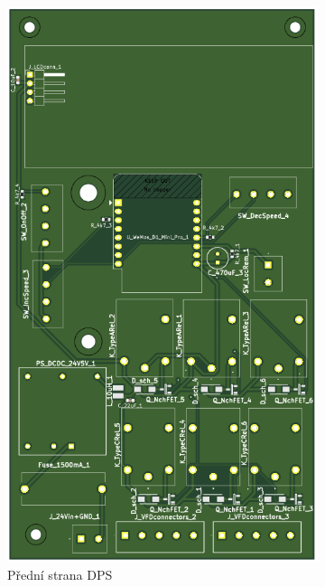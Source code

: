\begin{figure}[hptb]
	\centering
	\begin{subfigure}[t]{0.48\textwidth}
		\includegraphics[width=\textwidth]{images/PCBfront.png}
		\caption{Přední strana DPS}
		\label{fig:PCBfront}
	\end{subfigure}%
	\hfill
	\begin{subfigure}[t]{0.48\textwidth}

\end{subfigure}
\end{figure}
